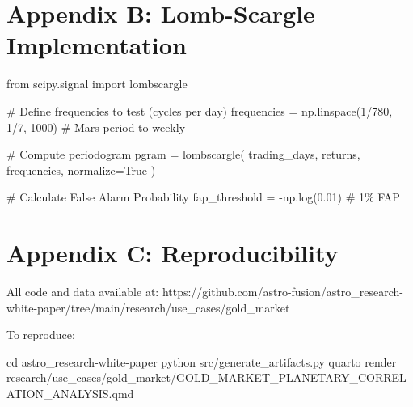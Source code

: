 \documentclass[
  11pt,
  a4paper,
  oneside,
  openany]{article}
\newenvironment{Shaded}{\begin{snugshade}}{\end{snugshade}}
\newcommand{\BuiltInTok}[1]{\textcolor[rgb]{0.00,0.23,0.31}{#1}}
\newcommand{\CommentTok}[1]{\textcolor[rgb]{0.37,0.37,0.37}{#1}}
\newcommand{\DecValTok}[1]{\textcolor[rgb]{0.68,0.00,0.00}{#1}}
\newcommand{\ExtensionTok}[1]{\textcolor[rgb]{0.00,0.23,0.31}{#1}}
\newcommand{\FloatTok}[1]{\textcolor[rgb]{0.68,0.00,0.00}{#1}}
\newcommand{\ImportTok}[1]{\textcolor[rgb]{0.00,0.46,0.62}{#1}}
\newcommand{\NormalTok}[1]{\textcolor[rgb]{0.00,0.23,0.31}{#1}}
\newcommand{\OperatorTok}[1]{\textcolor[rgb]{0.37,0.37,0.37}{#1}}
\newcommand{\VariableTok}[1]{\textcolor[rgb]{0.07,0.07,0.07}{#1}}
\begin{document}
\section{Appendix B: Lomb-Scargle
Implementation}\label{appendix-b-lomb-scargle-implementation}

\begin{Shaded}
\begin{Highlighting}[]
\ImportTok{from}\NormalTok{ scipy.signal }\ImportTok{import}\NormalTok{ lombscargle}

\CommentTok{\# Define frequencies to test (cycles per day)}
\NormalTok{frequencies }\OperatorTok{=}\NormalTok{ np.linspace(}\DecValTok{1}\OperatorTok{/}\DecValTok{780}\NormalTok{, }\DecValTok{1}\OperatorTok{/}\DecValTok{7}\NormalTok{, }\DecValTok{1000}\NormalTok{)  }\CommentTok{\# Mars period to weekly}

\CommentTok{\# Compute periodogram}
\NormalTok{pgram }\OperatorTok{=}\NormalTok{ lombscargle(}
\NormalTok{    trading\_days,}
\NormalTok{    returns,}
\NormalTok{    frequencies,}
\NormalTok{    normalize}\OperatorTok{=}\VariableTok{True}
\NormalTok{)}

\CommentTok{\# Calculate False Alarm Probability}
\NormalTok{fap\_threshold }\OperatorTok{=} \OperatorTok{{-}}\NormalTok{np.log(}\FloatTok{0.01}\NormalTok{)  }\CommentTok{\# 1\% FAP}
\end{Highlighting}
\end{Shaded}

\section{Appendix C: Reproducibility}\label{appendix-c-reproducibility}

All code and data available at:
https://github.com/astro-fusion/astro\_research-white-paper/tree/main/research/use\_cases/gold\_market

To reproduce:

\begin{Shaded}
\begin{Highlighting}[]
\BuiltInTok{cd}\NormalTok{ astro\_research{-}white{-}paper}
\ExtensionTok{python}\NormalTok{ src/generate\_artifacts.py}
\ExtensionTok{quarto}\NormalTok{ render research/use\_cases/gold\_market/GOLD\_MARKET\_PLANETARY\_CORRELATION\_ANALYSIS.qmd}
\end{Highlighting}
\end{Shaded}
\end{document}
